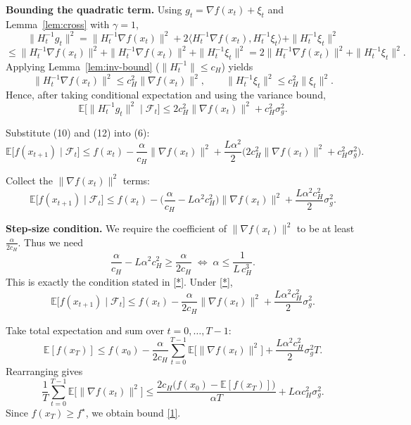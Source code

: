 \documentclass{article}
\newcommand{\E}{\mathbb{E}}
\newcommand{\ip}[2]{\langle #1,#2\rangle}
\begin{document}
\begin{enumerate}[label={[\arabic*]}]
\item \textbf{Bounding the quadratic term.}  
Using $g_t=\nabla f(x_t)+\xi_t$ and Lemma~\ref{lem:cross} with $\gamma=1$,
\[
\|H_t^{-1}g_t\|^{2}
 =\|H_t^{-1}\nabla f(x_t)\|^{2}
   +2\ip{H_t^{-1}\nabla f(x_t)}{H_t^{-1}\xi_t}
   +\|H_t^{-1}\xi_t\|^{2}
\]
\[
\le \|H_t^{-1}\nabla f(x_t)\|^{2}
   +\|H_t^{-1}\nabla f(x_t)\|^{2}
   +\|H_t^{-1}\xi_t\|^{2}
 =2\|H_t^{-1}\nabla f(x_t)\|^{2}+\|H_t^{-1}\xi_t\|^{2}.
\tag{11}
\]
Applying Lemma~\ref{lem:inv-bound} ($\|H_t^{-1}\|\le c_H$) yields
\[
\|H_t^{-1}\nabla f(x_t)\|^{2}\le c_H^{2}\|\nabla f(x_t)\|^{2},
\qquad
\|H_t^{-1}\xi_t\|^{2}\le c_H^{2}\|\xi_t\|^{2}.
\]
Hence, after taking conditional expectation and using the variance bound,
\[
\E\!\big[\|H_t^{-1}g_t\|^{2}\mid\mathcal{F}_t\big]
\le 2c_H^{2}\|\nabla f(x_t)\|^{2}+c_H^{2}\sigma_g^{2}.
\tag{12}
\]

\item Substitute (10) and (12) into (6):
\[
\E\!\big[f(x_{t+1})\mid\mathcal{F}_t\big]
\le f(x_t)-\frac{\alpha}{c_H}\|\nabla f(x_t)\|^{2}
   +\frac{L\alpha^{2}}{2}\big(2c_H^{2}\|\nabla f(x_t)\|^{2}+c_H^{2}\sigma_g^{2}\big).
\tag{13}
\]

\item Collect the $\|\nabla f(x_t)\|^{2}$ terms:
\[
\E\!\big[f(x_{t+1})\mid\mathcal{F}_t\big]
\le f(x_t)-\Big(\frac{\alpha}{c_H}-L\alpha^{2}c_H^{2}\Big)\|\nabla f(x_t)\|^{2}
   +\frac{L\alpha^{2}c_H^{2}}{2}\sigma_g^{2}.
\tag{14}
\]

\item \textbf{Step‑size condition.}  
We require the coefficient of $\|\nabla f(x_t)\|^{2}$ to be at least $\frac{\alpha}{2c_H}$.
Thus we need
\[
\frac{\alpha}{c_H}-L\alpha^{2}c_H^{2}\ge\frac{\alpha}{2c_H}
\;\Longleftrightarrow\;
\alpha\le\frac{1}{L\,c_H^{3}} .
\tag{15}
\]
This is exactly the condition stated in \eqref{*}. Under \eqref{*},
\[
\E\!\big[f(x_{t+1})\mid\mathcal{F}_t\big]
\le f(x_t)-\frac{\alpha}{2c_H}\|\nabla f(x_t)\|^{2}
   +\frac{L\alpha^{2}c_H^{2}}{2}\sigma_g^{2}.
\tag{16}
\]

\item Take total expectation and sum over $t=0,\dots,T-1$:
\[
\E[f(x_T)]\le f(x_0)-\frac{\alpha}{2c_H}\sum_{t=0}^{T-1}\E\!\big[\|\nabla f(x_t)\|^{2}\big]
   +\frac{L\alpha^{2}c_H^{2}}{2}\sigma_g^{2}T .
\tag{17}
\]
Rearranging gives
\[
\frac1T\sum_{t=0}^{T-1}\E\!\big[\|\nabla f(x_t)\|^{2}\big]
\le \frac{2c_H\big(f(x_0)-\E[f(x_T)]\big)}{\alpha T}
   +L\alpha c_H^{2}\sigma_g^{2}.
\tag{18}
\]
Since $f(x_T)\ge f^\star$, we obtain bound \eqref{1}.
\end{enumerate}
\end{document}
